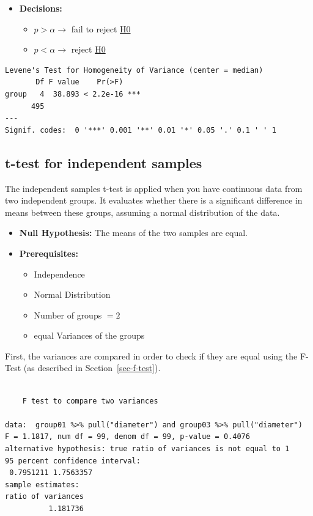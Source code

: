\documentclass[
  a4paper,
]{scrbook}
\providecommand{\tightlist}{%
  \setlength{\itemsep}{0pt}\setlength{\parskip}{0pt}}\usepackage{longtable,booktabs,array}
\begin{document}
\begin{itemize}
\tightlist
\item
  \textbf{Decisions:}

  \begin{itemize}
  \tightlist
  \item
    \(p> \alpha \rightarrow\) fail to reject \hyperref[H0]{H0}
  \item
    \(p< \alpha \rightarrow\) reject \hyperref[H0]{H0}
  \end{itemize}
\end{itemize}

\begin{verbatim}
Levene's Test for Homogeneity of Variance (center = median)
       Df F value    Pr(>F)    
group   4  38.893 < 2.2e-16 ***
      495                      
---
Signif. codes:  0 '***' 0.001 '**' 0.01 '*' 0.05 '.' 0.1 ' ' 1
\end{verbatim}

\subsection{t-test for independent
samples}\label{t-test-for-independent-samples}

The independent samples t-test is applied when you have continuous data
from two independent groups. It evaluates whether there is a significant
difference in means between these groups, assuming a normal distribution
of the data.

\begin{itemize}
\tightlist
\item
  \textbf{Null Hypothesis:} The means of the two samples are equal.
\item
  \textbf{Prerequisites:}

  \begin{itemize}
  \tightlist
  \item
    Independence
  \item
    Normal Distribution
  \item
    Number of groups \(=2\)
  \item
    equal Variances of the groups
  \end{itemize}
\end{itemize}

First, the variances are compared in order to check if they are equal
using the F-Test (as described in Section~\ref{sec-f-test}).

\begin{verbatim}

    F test to compare two variances

data:  group01 %>% pull("diameter") and group03 %>% pull("diameter")
F = 1.1817, num df = 99, denom df = 99, p-value = 0.4076
alternative hypothesis: true ratio of variances is not equal to 1
95 percent confidence interval:
 0.7951211 1.7563357
sample estimates:
ratio of variances 
          1.181736 
\end{verbatim}
\end{document}
